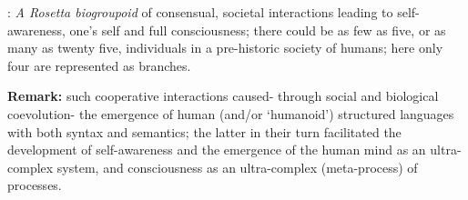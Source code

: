 \documentclass[12pt]{article}
\theoremstyle{plain}
\theoremstyle{definition}
\numberwithin{equation}{section}
\newcommand{\med}{\medbreak}
\newcommand{\<}{{\langle}}
\begin{document}
\med
{}: \emph{A Rosetta biogroupoid} of
consensual, societal interactions leading to self-awareness, one's
self and full consciousness; there could be as few as five, or as
many as twenty five, individuals in a pre-historic society of
humans; here only four are represented as branches.




\textbf{Remark:} such cooperative interactions caused- through social and biological coevolution- the emergence of human (and/or `humanoid') structured languages with both syntax and semantics; the latter in their turn facilitated the development of self-awareness and the emergence of the human mind as an ultra-complex system, and consciousness as an ultra-complex (meta-process) of processes. 

\end{document}
